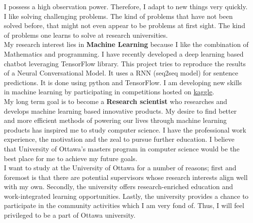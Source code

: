\documentclass{article}
\begin{document}
I possess a high observation power. Therefore, I adapt to new things very quickly. I like solving challenging problems. The kind of problems that have not been solved before, that might not even appear to be problems at first sight. The kind of problems one learns to solve at research universities.\\

My research interest lies in \textbf{Machine Learning} because I like the combination of Mathematics and programming. I have recently developed a deep learning based chatbot leveraging TensorFlow library. This project tries to reproduce the results of a Neural Conversational Model. It uses a RNN (seq2seq model) for sentence predictions. It is done using python and TensorFlow. I am developing new skills in machine learning by participating in competitions hosted on \href{https://www.kaggle.com/}{kaggle}.\\

My long term goal is to become a \textbf{Research scientist} who researches and develops machine learning based innovative products. My desire to find better and more efficient methods of powering our lives through machine learning products has inspired me to study computer science. I have the professional work experience, the motivation and the zeal to pursue further education. I believe that University of Ottawa’s masters program in computer science would be the best place for me to achieve my future goals.\\

I want to study at the University of Ottawa for a number of reasons; first and foremost is that there are potential supervisors whose research interests align well with my own. Secondly, the university offers research-enriched education and work-integrated learning opportunities. Lastly, the university provides a chance to participate in the community activities which I am very fond of. Thus, I will feel privileged to be a part of Ottawa university.

  
\end{document}
